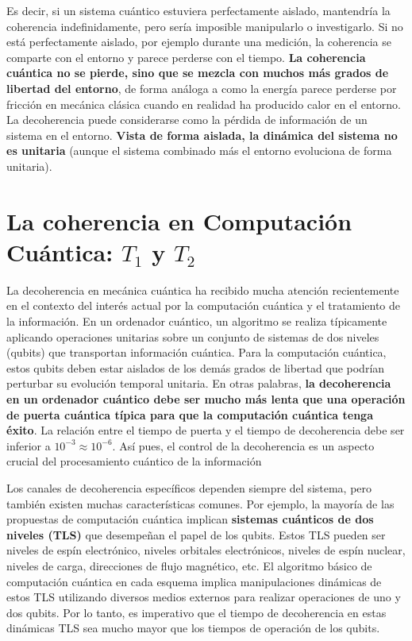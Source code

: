     Es decir, si un sistema cuántico estuviera perfectamente aislado, mantendría la coherencia indefinidamente, pero sería imposible manipularlo o investigarlo. Si no está perfectamente aislado, por ejemplo durante una medición, la coherencia se comparte con el entorno y parece perderse con el tiempo. \textbf{La coherencia cuántica no se pierde, sino que se mezcla con muchos más grados de libertad del entorno}, de forma análoga a como la energía parece perderse por fricción en mecánica clásica cuando en realidad ha producido calor en el entorno. La decoherencia puede considerarse como la pérdida de información de un sistema en el entorno. \textbf{Vista de forma aislada, la dinámica del sistema no es unitaria} (aunque el sistema combinado más el entorno evoluciona de forma unitaria).

\section{La coherencia en Computación Cuántica: $T_1$ y $T_2$}

    La decoherencia en mecánica cuántica ha recibido mucha atención recientemente en el contexto del interés actual por la computación cuántica y el tratamiento de la información. En un ordenador cuántico, un algoritmo se realiza típicamente aplicando operaciones unitarias sobre un conjunto de sistemas de dos niveles (qubits) que transportan información cuántica. Para la computación cuántica, estos qubits deben estar aislados de los demás grados de libertad que podrían perturbar su evolución temporal unitaria. En otras palabras, \textbf{la decoherencia en un ordenador cuántico debe ser mucho más lenta que una operación de puerta cuántica típica para que la computación cuántica tenga éxito}. La relación entre el tiempo de puerta y el tiempo de decoherencia debe ser inferior a $10^{-3} \approx 10^{-6}$. Así pues, el control de la decoherencia es un aspecto crucial del procesamiento cuántico de la información
    
    Los canales de decoherencia específicos dependen siempre del sistema, pero también existen muchas características comunes. Por ejemplo, la mayoría de las propuestas de computación cuántica implican \textbf{sistemas cuánticos de dos niveles (TLS)} que desempeñan el papel de los qubits. Estos TLS pueden ser niveles de espín electrónico, niveles orbitales electrónicos, niveles de espín nuclear, niveles de carga, direcciones de flujo magnético, etc. El algoritmo básico de computación cuántica en cada esquema implica manipulaciones dinámicas de estos TLS utilizando diversos medios externos para realizar operaciones de uno y dos qubits. Por lo tanto, es imperativo que el tiempo de decoherencia en estas dinámicas TLS sea mucho mayor que los tiempos de operación de los qubits.
    
